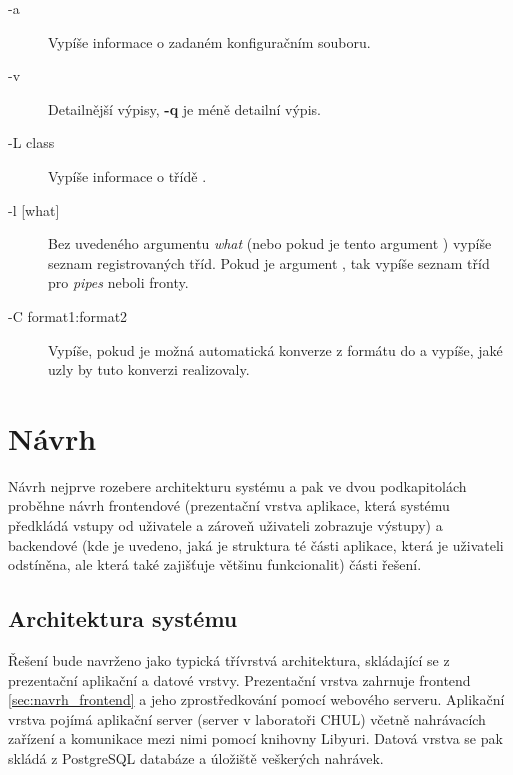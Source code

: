 \documentclass[thesis=M,czech]{FITthesis}[2012/06/26]
\begin{document}
\begin{description}
\begin{description}
	\item[-a] Vypíše informace o zadaném konfiguračním souboru.
	\item[-v] Detailnější výpisy, \textbf{-q} je méně detailní výpis.
	\item[-L class] Vypíše informace o třídě .
	\item[-l {[what]}] Bez uvedeného argumentu \textit{what} (nebo pokud je tento argument ) vypíše seznam registrovaných tříd. Pokud je argument , tak vypíše seznam tříd pro \textit{pipes} neboli fronty.
	\item[-C format1:format2] Vypíše, pokud je možná automatická konverze z formátu  do  a vypíše, jaké uzly by tuto konverzi realizovaly.
\end{description}

\end{description}


\chapter{Návrh} \label{chap:navrh}
Návrh nejprve rozebere architekturu systému a pak ve dvou podkapitolách proběhne návrh frontendové (prezentační vrstva aplikace, která systému předkládá vstupy od uživatele a zároveň uživateli zobrazuje výstupy) a backendové (kde je uvedeno, jaká je struktura té části aplikace, která je uživateli odstíněna, ale která také zajišťuje většinu funkcionalit) části řešení.

\section{Architektura systému} \label{sec:navrh_architektura}
Řešení bude navrženo jako typická třívrstvá architektura, skládající se z prezentační aplikační a datové vrstvy. Prezentační vrstva zahrnuje frontend \ref{sec:navrh_frontend} a jeho zprostředkování pomocí webového serveru. Aplikační vrstva pojímá aplikační server (server v laboratoři CHUL) včetně nahrávacích zařízení a komunikace mezi nimi pomocí knihovny Libyuri. Datová vrstva se pak skládá z PostgreSQL databáze a úložiště veškerých nahrávek.
\end{document}
